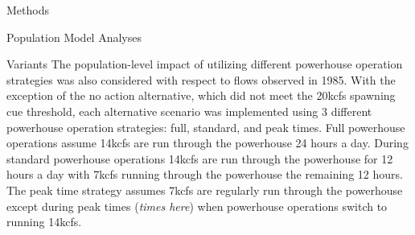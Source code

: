 \documentclass[12pt]{article}
\begin{document}
\begin{section}{Methods}
\begin{subsection}{Population Model Analyses}
\begin{subsubsection}{Variants}
The population-level impact of utilizing different powerhouse operation strategies was also considered with respect to flows observed in 1985.  With the exception of the no action alternative, which did not meet the 20kcfs spawning cue threshold, each alternative scenario was implemented using 3 different powerhouse operation strategies: full, standard, and peak times.  Full powerhouse operations assume 14kcfs are run through the powerhouse 24 hours a day.  During standard powerhouse operations 14kcfs are run through the powerhouse for 12 hours a day with 7kcfs running through the powerhouse the remaining 12 hours.  The peak time strategy assumes 7kcfs are regularly run through the powerhouse except during peak times (\textit{times here}) when powerhouse operations switch to running 14kcfs.   
\end{subsubsection}  
\end{subsection}
\end{section}
\end{document}
